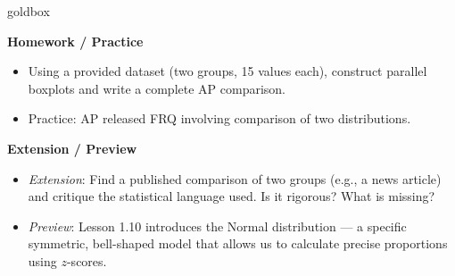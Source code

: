 \documentclass[10pt]{article}
\begin{document}
\begin{skillbox}{goldbox}
\begin{minipage}[t]{0.48\linewidth}
    \textbf{Homework / Practice}
    \begin{itemize}
        \item Using a provided dataset (two groups, 15 values each), construct parallel boxplots and write a complete AP comparison.
        \item Practice: AP released FRQ involving comparison of two distributions.
    \end{itemize}
\end{minipage}
\hfill
\begin{minipage}[t]{0.48\linewidth}
    \textbf{Extension / Preview}
    \begin{itemize}
        \item \textit{Extension}: Find a published comparison of two groups (e.g., a news article) and critique the statistical language used. Is it rigorous? What is missing?
        \item \textit{Preview}: Lesson 1.10 introduces the Normal distribution --- a specific symmetric, bell-shaped model that allows us to calculate precise proportions using $z$-scores.
    \end{itemize}
\end{minipage}
\end{skillbox}
\end{document}
